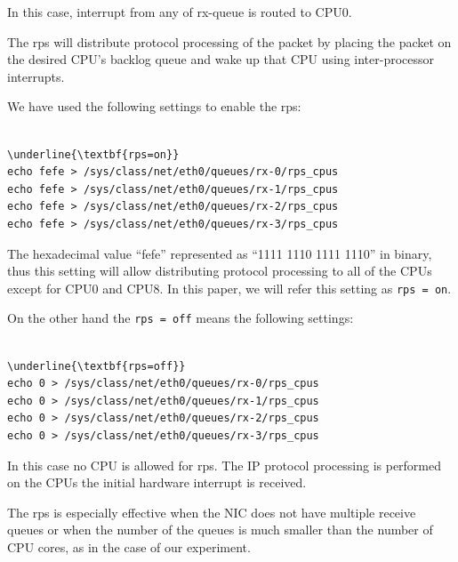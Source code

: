 In this case, interrupt from any of rx-queue is routed to CPU0.

The rps will distribute protocol processing of the packet by placing the packet
on the desired CPU's backlog queue and wake up that CPU using inter-processor interrupts.

We have used the following settings to enable the rps:

\begin{center}
\begin{minipage}{0.8\columnwidth}
\begin{Verbatim}[commandchars=\\\{\}]

\underline{\textbf{rps=on}}
echo fefe > /sys/class/net/eth0/queues/rx-0/rps_cpus
echo fefe > /sys/class/net/eth0/queues/rx-1/rps_cpus
echo fefe > /sys/class/net/eth0/queues/rx-2/rps_cpus
echo fefe > /sys/class/net/eth0/queues/rx-3/rps_cpus

\end{Verbatim}
\end{minipage}
\end{center}

The hexadecimal value \enquote{fefe} represented as \enquote{1111 1110 1111 1110} in binary, 
thus this setting will allow distributing protocol processing to all of the CPUs except for CPU0 and CPU8.
In this paper, we will refer this setting as {\tt rps = on}.

On the other hand the {\tt rps = off} means the following settings:

\begin{center}
\begin{minipage}{0.8\columnwidth}
\begin{Verbatim}[commandchars=\\\{\}]

\underline{\textbf{rps=off}}
echo 0 > /sys/class/net/eth0/queues/rx-0/rps_cpus
echo 0 > /sys/class/net/eth0/queues/rx-1/rps_cpus
echo 0 > /sys/class/net/eth0/queues/rx-2/rps_cpus
echo 0 > /sys/class/net/eth0/queues/rx-3/rps_cpus

\end{Verbatim}
\end{minipage}
\end{center}

In this case no CPU is allowed for rps. 
The IP protocol processing is performed on the CPUs the initial hardware interrupt is received.

The rps is especially effective when the NIC does not have multiple receive queues or when the number of the queues is 
much smaller than the number of CPU cores, as in the case of our experiment.


